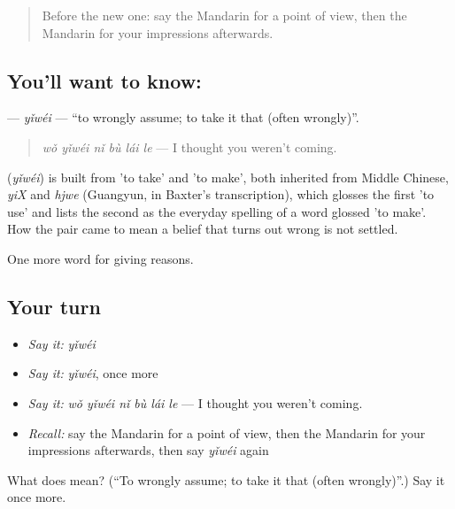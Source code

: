 \begin{quote}
Before the new one: say the Mandarin for a point of view, then the Mandarin for your impressions afterwards.
\end{quote}

\subsection*{You'll want to know: }
\textbf{} — \emph{yǐwéi} — \textquotedblleft{}to wrongly assume; to take it that (often wrongly)\textquotedblright{}.

\begin{quote}
\textbf{} \emph{wǒ yǐwéi nǐ bù lái le} — I thought you weren't coming.
\end{quote}

\begin{cousinweb}
\textbf{} (\emph{yǐwéi}) is built from  'to take' and  'to make', both inherited from Middle Chinese, \emph{yiX} and \emph{hjwe} (Guangyun, in Baxter's transcription), which glosses the first 'to use' and lists the second as the everyday spelling of a word glossed 'to make'. How the pair came to mean a belief that turns out wrong is not settled.
\end{cousinweb}

\begin{grammarlens}[title={What you've built}]
One more word for giving reasons.
\end{grammarlens}

\subsection*{Your turn}
\begin{itemize}
\raggedright
  \item \emph{Say it:} \emph{yǐwéi}
  \item \emph{Say it:} \emph{yǐwéi}, once more
  \item \emph{Say it:} \emph{wǒ yǐwéi nǐ bù lái le} — I thought you weren't coming.
  \item \emph{Recall:} say the Mandarin for a point of view, then the Mandarin for your impressions afterwards, then say \emph{yǐwéi} again
\end{itemize}

\begin{tcolorbox}[breakable,colback=teal!4,colframe=teal!35!black,title={Before you move on}]
What does  mean? (\textquotedblleft{}To wrongly assume; to take it that (often wrongly)\textquotedblright{}.) Say it once more.
\end{tcolorbox}
